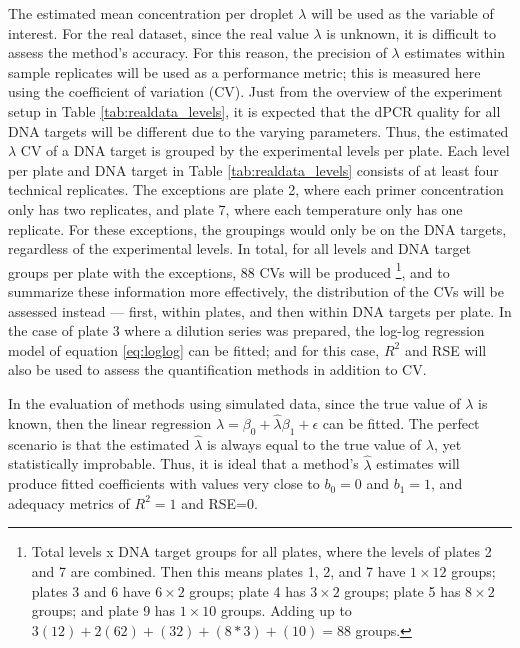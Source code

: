 The estimated mean concentration per droplet \(\lambda\) will be used as the variable of interest. For the real dataset, since the real value \(\lambda\) is unknown, it is difficult to assess the method's accuracy. For this reason, the precision of \(\lambda\) estimates within sample replicates will be used as a performance metric; this is measured here using the coefficient of variation (CV). Just from the overview of the experiment setup in Table \ref{tab:realdata_levels}, it is expected that the dPCR quality for all DNA targets will be different due to the varying parameters. Thus, the estimated \(\lambda\) CV of a DNA target is grouped by the experimental levels per plate. Each level per plate and DNA target in Table \ref{tab:realdata_levels} consists of at least four technical replicates. The exceptions are plate 2, where each primer concentration only has two replicates, and plate 7, where each temperature only has one replicate. For these exceptions, the groupings would only be on the DNA targets, regardless of the experimental levels. In total, for all levels and DNA target groups per plate with the exceptions, 88 CVs will be produced \footnote{Total levels x DNA target groups for all plates, where the levels of plates 2 and 7 are combined. Then this means plates 1, 2, and 7 have \(1 \times 12\) groups; plates 3 and 6 have \(6 \times 2\) groups; plate 4 has \(3 \times 2\) groups; plate 5 has \(8 \times 2\) groups; and plate 9 has \(1 \times 10\) groups. Adding up to \(3(12) + 2(62) + (32) + (8*3) + (10) = 88\) groups.}, and to summarize these information more effectively, the distribution of the CVs will be assessed instead — first, within plates, and then within DNA targets per plate. In the case of plate 3 where a dilution series was prepared, the log-log regression model of equation \ref{eq:loglog} can be fitted; and for this case, \(R^2\) and RSE will also be used to assess the quantification methods in addition to CV.

In the evaluation of methods using simulated data, since the true value of \(\lambda\) is known, then the linear regression \(\lambda = \beta_0 + \hat{\lambda}\beta_1 + \epsilon\) can be fitted. The perfect scenario is that the estimated \(\hat{\lambda}\) is always equal to the true value of \(\lambda\), yet statistically improbable. Thus, it is ideal that a method's \(\hat{\lambda}\) estimates will produce fitted coefficients with values very close to \(b_0=0\) and \(b_1=1\), and adequacy metrics of \(R^2=1\) and RSE=0.